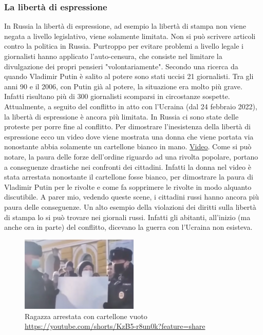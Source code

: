 \documentclass[a4paper, 12pt]{article}
\begin{document}


\subsubsection{La libertà di espressione}

In Russia la libertà di espressione, ad esempio la libertà di stampa non viene negata a livello legislativo, viene solamente limitata. Non si può scrivere articoli contro la politica in Russia. Purtroppo per evitare problemi a livello legale i giornalisti hanno applicato l'auto-censura, che consiste nel limitare la divulgazione dei propri pensieri "volontariamente". Secondo una ricerca da quando Vladimir Putin è salito al potere sono stati uccisi 21 giornalisti. Tra gli anni 90 e il 2006, con Putin già al potere, la situazione era molto più grave. Infatti risultano più di 300 giornalisti scomparsi in circostanze sospette. Attualmente, a seguito del conflitto in atto con l'Ucraina (dal 24 febbraio 2022), la libertà di espressione è ancora più limitata. In Russia ci sono state delle proteste per porre fine al conflitto. Per dimostrare l'inesistenza della libertà di espressione ecco un video dove viene mostrata una donna che viene portata via nonostante abbia solamente un cartellone bianco in mano. \href{https://youtube.com/shorts/KzB5-r8un0k?feature=share}{Video}. Come si può notare, la paura delle forze dell'ordine riguardo ad una rivolta popolare, portano a conseguenze drastiche nei confronti dei cittadini. Infatti la donna nel video è stata arrestata nonostante il cartellone fosse bianco, per dimostrare la paura di Vladimir Putin per le rivolte e come fa sopprimere le rivolte in modo alquanto discutibile. A parer mio, vedendo queste scene, i cittadini russi hanno ancora più paura delle conseguenze. Un alto esempio della violazioni dei diritti sulla libertà di stampa lo si può trovare nei giornali russi. Infatti gli abitanti, all'inizio (ma anche ora in parte) del conflitto, dicevano la guerra con l'Ucraina non esisteva.

\begin{figure}[h]
    \centering
    \includegraphics[width=0.5\textwidth]{images/blank_billboard.png}
    \caption{Ragazza arrestata con cartellone vuoto\\\hspace{\textwidth}\href{https://youtube.com/shorts/KzB5-r8un0k?feature=share}{https://youtube.com/shorts/KzB5-r8un0k?feature=share}}
\end{figure}
\end{document}
